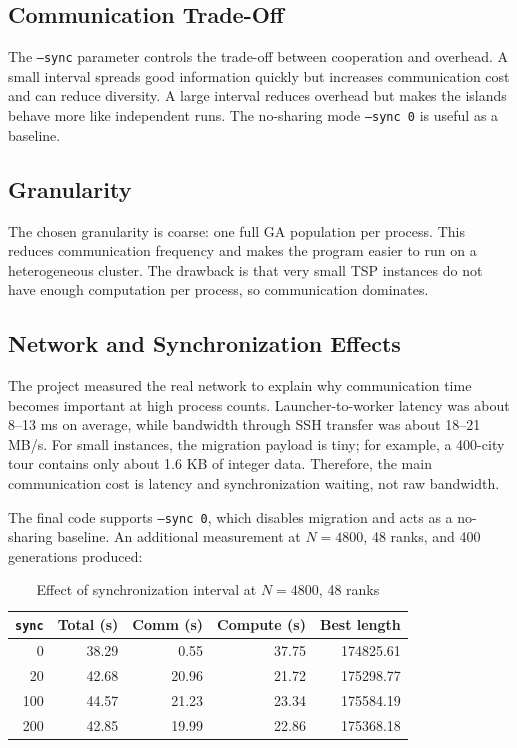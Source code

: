 \documentclass[11pt,a4paper]{article}
\begin{document}
\subsection{Communication Trade-Off}
The \texttt{--sync} parameter controls the trade-off between cooperation and
overhead. A small interval spreads good information quickly but increases
communication cost and can reduce diversity. A large interval reduces overhead
but makes the islands behave more like independent runs. The no-sharing mode
\texttt{--sync 0} is useful as a baseline.

\subsection{Granularity}
The chosen granularity is coarse: one full GA population per process. This
reduces communication frequency and makes the program easier to run on a
heterogeneous cluster. The drawback is that very small TSP instances do not have
enough computation per process, so communication dominates.

\subsection{Network and Synchronization Effects}
The project measured the real network to explain why communication time becomes
important at high process counts. Launcher-to-worker latency was about 8--13 ms
on average, while bandwidth through SSH transfer was about 18--21 MB/s. For
small instances, the migration payload is tiny; for example, a 400-city tour
contains only about 1.6 KB of integer data. Therefore, the main communication
cost is latency and synchronization waiting, not raw bandwidth.

The final code supports \texttt{--sync 0}, which disables migration and acts as
a no-sharing baseline. An additional measurement at $N=4800$, 48 ranks, and 400
generations produced:

\begin{table}[H]
\centering
\caption{Effect of synchronization interval at $N=4800$, 48 ranks}
\begin{tabular}{rrrrr}
\toprule
\texttt{sync} & Total (s) & Comm (s) & Compute (s) & Best length \\
\midrule
0   & 38.29 & 0.55  & 37.75 & 174825.61 \\
20  & 42.68 & 20.96 & 21.72 & 175298.77 \\
100 & 44.57 & 21.23 & 23.34 & 175584.19 \\
200 & 42.85 & 19.99 & 22.86 & 175368.18 \\
\bottomrule
\end{tabular}
\end{table}
\end{document}
